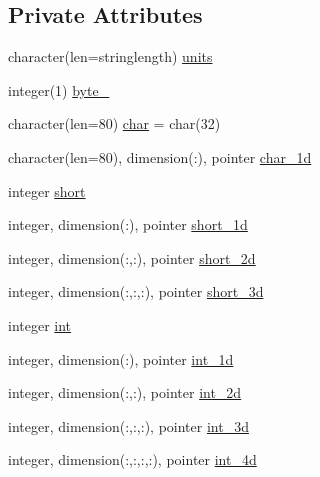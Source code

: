 \subsection*{Private Attributes}
\begin{DoxyCompactItemize}
\item 
character(len=stringlength) \mbox{\hyperlink{structmoduleera40format_1_1t__value_a41e74305100780d5f75f70e0ae1fe750}{units}}
\item 
integer(1) \mbox{\hyperlink{structmoduleera40format_1_1t__value_ab0cef5cfd7be066267dedff8303c4178}{byte\+\_\+}}
\item 
character(len=80) \mbox{\hyperlink{structmoduleera40format_1_1t__value_a4b4b7582e814f3ccfb8efd19e5add0eb}{char}} = char(32)
\item 
character(len=80), dimension(\+:), pointer \mbox{\hyperlink{structmoduleera40format_1_1t__value_a018a728acf20994230fa69d3631c9a4a}{char\+\_\+1d}}
\item 
integer \mbox{\hyperlink{structmoduleera40format_1_1t__value_a484a89256cf890452bacfb0cec5753d2}{short}}
\item 
integer, dimension(\+:), pointer \mbox{\hyperlink{structmoduleera40format_1_1t__value_a81dd0c84bfe8a3ae0df3892bcf9fd73a}{short\+\_\+1d}}
\item 
integer, dimension(\+:,\+:), pointer \mbox{\hyperlink{structmoduleera40format_1_1t__value_a0079d29612c764ea62987aae698dad6e}{short\+\_\+2d}}
\item 
integer, dimension(\+:,\+:,\+:), pointer \mbox{\hyperlink{structmoduleera40format_1_1t__value_a7837d734d4aa9f87643e7ee0101aab4b}{short\+\_\+3d}}
\item 
integer \mbox{\hyperlink{structmoduleera40format_1_1t__value_a19767f7d723421892f0782273c1e65fb}{int}}
\item 
integer, dimension(\+:), pointer \mbox{\hyperlink{structmoduleera40format_1_1t__value_ad28c3f075703466f134b576328683e15}{int\+\_\+1d}}
\item 
integer, dimension(\+:,\+:), pointer \mbox{\hyperlink{structmoduleera40format_1_1t__value_af6e9cbb41e90d0e0aec109de90418fc0}{int\+\_\+2d}}
\item 
integer, dimension(\+:,\+:,\+:), pointer \mbox{\hyperlink{structmoduleera40format_1_1t__value_a3760e33a380ff4efaac3322fda5f8140}{int\+\_\+3d}}
\item 
integer, dimension(\+:,\+:,\+:,\+:), pointer \mbox{\hyperlink{structmoduleera40format_1_1t__value_a0e8eea9b14e58b853a7e78e5c9e0aa95}{int\+\_\+4d}}
\item 

\end{DoxyCompactItemize}

